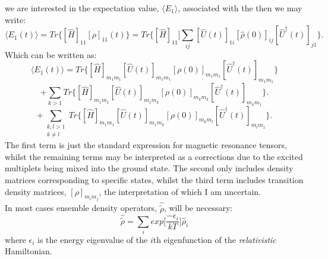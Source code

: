 \documentclass[12pt]{article}
\begin{document}
 we are interested in the expectation value, $\langle E_{1} \rangle$, associated with the 
then we may write:
\begin{equation}
\langle E_{1}(t) \rangle =
Tr\{ [\hat{H}]_{11}[\rho]_{11}(t) \} = 
Tr\{ [\hat{H}]_{11}] \sum_{ij} [\hat{U}(t)]_{1i}[\hat{\rho}(0)]_{ij} [\hat{U}^{\dagger}(t)]_{j1}\}.
\end{equation}
\noindent Which can be written as:
\begin{equation*}
\langle E_{1}(t) \rangle =
Tr\{ [\hat{H}]_{m_{1}m_{1}} [\hat{U}(t)]_{m_{1}m_{1}}[\rho(0)]_{m_{1}m_{1}} [\hat{U}^{\dagger}(t)]_{m_{1}m_{1}}\} 
\end{equation*}
\begin{equation*}
+ \sum_{k>1}Tr\{ [\hat{H}]_{m_{1}m_{1}} [\hat{U}(t)]_{m_{1}m_{k}}[\rho(0)]_{m_{k}m_{k}} [\hat{U}^{\dagger}(t)]_{m_{k}m_{1}}\}.
\end{equation*}
\begin{equation}
+ \sum_{\substack{k, l > 1 \\ k\neq l } }
Tr\{ [\hat{H}]_{m_{1}m_{1}} [\hat{U}(t)]_{m_{1}m_{k}}[\rho(0)]_{m_{k}m_{l}} [\hat{U}^{\dagger}(t)]_{m_{l}m_{1}}\}.
\end{equation}
\noindent The first term is just the standard expression for magnetic resonance tensors,
whilst the remaining terms may be interpreted as a corrections due to the excited multiplets being mixed into the ground state.
The second only includes density matrices corresponding to specific states, whilst the third term includes
transition density matrices, $[\rho]_{m_{i}m_{j}}$, the interpretation of which I am uncertain.\\

\noindent In most cases ensemble density operators, $\hat{\tilde{\rho}}$, will be necessary:
\begin{equation}
\hat{\tilde{\rho}} = \sum_{i}exp\Big[\frac{-\epsilon_{i}}{kT}\Big]\hat{\rho}_{i} 
\end{equation}
\noindent where $\epsilon_{i}$ is the energy eigenvalue of the $i$th eigenfunction of the \emph{relativistic} Hamiltonian. 
\end{document}
